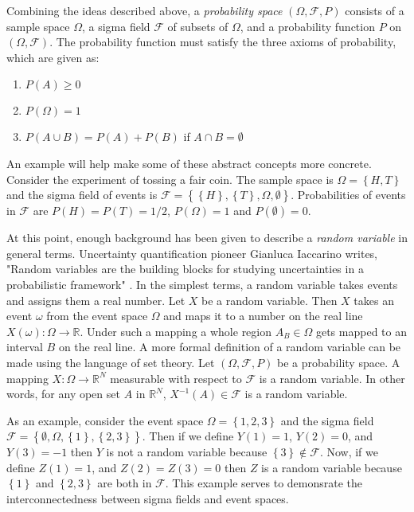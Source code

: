 Combining the ideas described above, a \textit{probability space} $\left(\Omega,\mathcal{F},P \right)$ consists of a sample space $\Omega$, a sigma field $\mathcal{F}$ of subsets of $\Omega$, and a probability function $P$ on $\left(\Omega,\mathcal{F}\right)$. The probability function must satisfy the three axioms of probability, which are given as:
\begin{enumerate}
   \item $P(A)\geq 0$
   \item $P\left(\Omega\right)=1$
   \item $P\left(A\cup B\right)=P\left(A\right)+P\left(B\right)$ if
      $A\cap B=\emptyset$
\end{enumerate} 
An example will help make some of these abstract concepts more concrete. Consider the experiment of tossing a fair coin. The sample space is $\Omega =\left\lbrace H,T\right\rbrace$  and the sigma field of events is  $\mathcal{F}=\left\{\left\{H\right\},\left\{T\right\}, \Omega,\emptyset\right\}$. Probabilities of events in $\mathcal{F}$ are $P\left({H}\right) = P\left({T}\right)=1/2$, $P\left(\Omega\right) = 1$ and $P\left(\emptyset\right) = 0$.

At this point, enough background has been given to describe a \textit{random variable} in general terms. Uncertainty quantification pioneer Gianluca Iaccarino writes, "Random variables are the building blocks for studying uncertainties in a probabilistic framework" \cite{Iaccarino_quote}. In the simplest terms, a random variable takes events and assigns them a real number. Let $X$ be a random variable. Then $X$ takes an event $\omega$ from the event space $\Omega$ and maps it to a number on the real line $X\left(\omega\right): \Omega \rightarrow \mathbb{R}$. Under such a mapping a whole region $A_B \in \Omega$ gets mapped to an interval $B$ on the real line. A more formal definition of a random variable can be made using the language of set theory. Let $\left(\Omega,\mathcal{F},P\right)$ be a probability space. A mapping $X:\Omega \rightarrow \mathbb{R}^N$ measurable with respect to $\mathcal{F}$ is a random variable. In other words, for any open set $A$ in $\mathbb{R}^N$, $X^{-1}\left(A\right) \in \mathcal{F}$ is a random variable.

As an example, consider the event space $\Omega=\left\{1,2,3\right\}$ and the sigma field \ $\mathcal{F}=\left\{\emptyset, \Omega, \left\{1\right\}, \left\{2,3\right\}\right\}$. Then if we define $Y\left(1\right)=1$, $Y\left(2\right)=0$, and $Y\left(3\right)=-1$ then $Y$ is not a random variable because $\left\{3\right\}\notin \mathcal{F}$. Now, if we define $Z\left(1\right)=1$, and $Z\left(2\right)=Z\left(3\right)=0$ then $Z$ is a random variable because $\left\{1\right\}$ and $\left\{2,3\right\}$ are both in $\mathcal{F}$. This example serves to demonsrate the interconnectedness between  sigma fields and event spaces.

